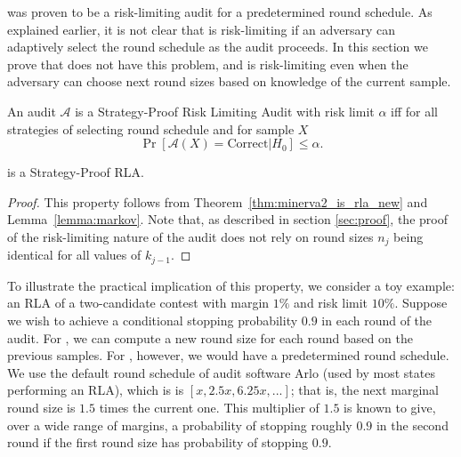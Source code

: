 

\Minerva was proven to be a risk-limiting audit for a predetermined round schedule.
As explained earlier, it is not clear that \Minerva is risk-limiting if an adversary can 
adaptively select the round schedule as the audit proceeds. In this section we prove that \Providence does not have this problem, and is risk-limiting even when the adversary can choose next round sizes based on knowledge of the current sample. 

\begin{definition}
 An audit $\mathcal{A}$ is a Strategy-Proof Risk Limiting Audit with risk limit $\alpha$ iff for
 all strategies of selecting round schedule and for sample $X$ 
 \[
  \Pr\left[\mathcal{A}(X) = \text{Correct} | H_0\right] \leq \alpha.
 \]

\end{definition}

\begin{lemma}
\Providence is a Strategy-Proof RLA. 
\end{lemma}
\begin{proof}
This property follows from Theorem~\ref{thm:minerva2_is_rla_new} and Lemma~\ref{lemma:markov}. Note that, as described in section \ref{sec:proof}, the proof of the risk-limiting nature of the audit does not rely on round sizes $n_j$ being identical for all values of $k_{j-1}$. 
\end{proof}

To illustrate the practical implication of this property, we consider a toy example: an RLA of a two-candidate contest with margin $1\%$ and risk limit $10\%$. 
Suppose we wish to achieve a conditional stopping probability $0.9$ in each round of the audit. For \Providence, we can compute a new round size for each round based on the previous samples. For \Minerva, however, we would have a predetermined round schedule. We use the default \Minerva round schedule of audit software Arlo \cite{arlo} (used by most states performing an RLA), which is is $[x, 2.5x, 6.25x, ...]$; that is, the next marginal round size is $1.5$ times the current one. This multiplier of $1.5$ is known to give, over a wide range of margins, a probability of stopping roughly $0.9$ in the second round if the first round size has probability of stopping $0.9$. 

